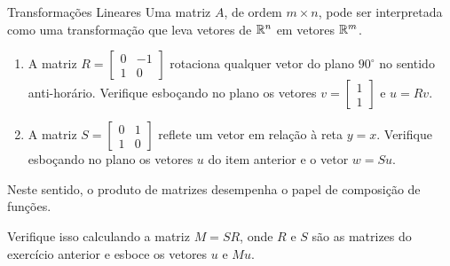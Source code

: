 \begin{frame}[label=matrizes]{Transformações Lineares}
Uma matriz $A$, de ordem $m\times n$, pode ser interpretada como uma {\color{blue}transformação} que leva vetores de $\mathbb{R}^n$ em vetores $\mathbb{R}^m$.

\begin{exer}
\begin{enumerate}
\item  A matriz 
$R=\begin{bmatrix}
0 & -1\\ 1 & 0 
\end{bmatrix}$ rotaciona qualquer vetor do plano $90^\circ$ no sentido anti-horário. Verifique esboçando no plano os vetores $v=\begin{bmatrix}
1\\ 1
\end{bmatrix}$ e $u=Rv$.

\item A matriz $S=\begin{bmatrix}
0 & 1\\ 1 & 0 
\end{bmatrix}$ reflete um vetor em relação à reta $y=x$. Verifique esboçando no plano os vetores $u$ do item anterior e o vetor  $w=Su$.
\end{enumerate}
\end{exer}


\end{frame}


\begin{frame}[label=matrizes]
Neste sentido, o {\color{blue}produto de matrizes} desempenha o papel de composição de funções.
\begin{exer}
Verifique isso calculando a matriz $M=SR$, onde $R$ e $S$ são as matrizes do exercício anterior e esboce os vetores $u$ e $Mu$.
\end{exer}


\end{frame}


